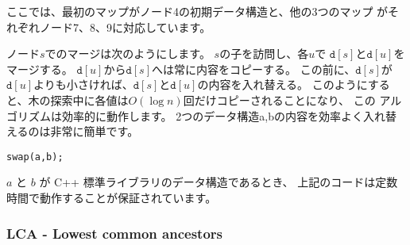\begin{center}
\end{center}

ここでは、最初のマップがノード4の初期データ構造と、他の3つのマップ がそれぞれノード7、8、9に対応しています。

ノード$s$でのマージは次のようにします。
$s$の子を訪問し、各$u$で $\texttt{d}[s]$と$\texttt{d}[u]$をマージする。
$\texttt{d}[u]$から$\texttt{d}[s]$へは常に内容をコピーする。
この前に、$\texttt{d}[s]$が$\texttt{d}[u]$よりも小さければ、$\texttt{d}[s]$と$\texttt{d}[u]$の内容を入れ替える。
このようにすると、木の探索中に各値は$O(\log n)$回だけコピーされることになり、
この アルゴリズムは効率的に動作します。
2つのデータ構造a,bの内容を効率よく入れ替えるのは非常に簡単です。

\begin{lstlisting}
swap(a,b);
\end{lstlisting}
$a$ と $b$ が C++ 標準ライブラリのデータ構造であるとき、
上記のコードは定数時間で動作することが保証されています。

\subsubsection{LCA - Lowest common ancestors}

